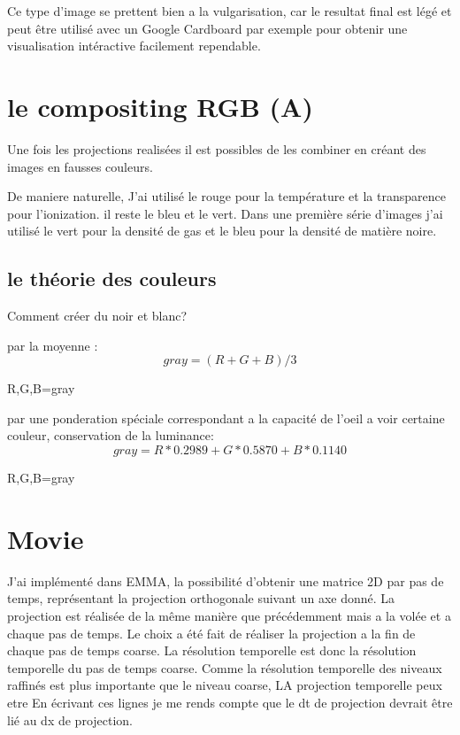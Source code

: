 Ce type d'image se prettent bien a la vulgarisation, car le resultat final est légé et peut être utilisé avec un Google Cardboard par exemple pour obtenir une visualisation intéractive facilement rependable.

\section{le compositing RGB (A)}
Une fois les projections realisées il est possibles de les combiner en créant des images en fausses couleurs.

De maniere naturelle, J'ai utilisé le rouge pour  la température et la transparence pour l'ionization.
il reste le bleu et le vert.
Dans une première série d'images j'ai utilisé le vert pour la densité de gas et le bleu pour la densité de matière noire.

\subsection{le théorie des couleurs}
Comment créer du noir et blanc?


par la moyenne :
\begin{equation}
gray= (R+G+B)/3
\end{equation}

R,G,B=gray


par une ponderation spéciale correspondant a la capacité de l'oeil a voir certaine couleur, conservation de la luminance:
\begin{equation}
gray = R*0.2989 + G*0.5870 +B*0.1140
\end{equation}

R,G,B=gray


\section{Movie}


J'ai implémenté dans EMMA, la possibilité d'obtenir une matrice 2D par pas de temps, représentant la projection orthogonale suivant un axe donné.
La projection est réalisée de la même manière que précédemment mais a la volée et a chaque pas de temps.
Le choix a été fait de réaliser la projection a la fin de chaque pas de temps coarse.
La résolution temporelle est donc la résolution temporelle du pas de temps coarse.
Comme la résolution temporelle des niveaux raffinés est plus importante que le niveau coarse, 
LA projection temporelle peux etre 
En écrivant ces lignes je me rends compte que le dt de projection devrait être lié au dx de projection. 

